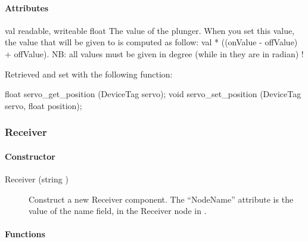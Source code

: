 \paragraph{Attributes}

\begin{itemize}
\begin{attribute}{val}
  {readable, writeable}
  {float}
  {}
  The value of the plunger. When you set this value, the
  value that will be given to \webots is computed as follow: val *
  ((onValue -{} offValue) + offValue).  NB: all values must be given in
  degree (while in \webots they are in radian) !

  Retrieved and set with the following \webots function:
\begin{cxx}
float servo_get_position  (DeviceTag servo);
void servo_set_position  (DeviceTag servo, float position);
\end{cxx}
\end{attribute}
\end{itemize}

\subsubsection{Receiver}

\paragraph{Constructor}

\begin{description}
\item[{Receiver (string )}] Construct a new Receiver
  component. The ``NodeName'' attribute is the value of the name
  field, in the Receiver node in \webots.
\end{description}

\paragraph{Functions}

